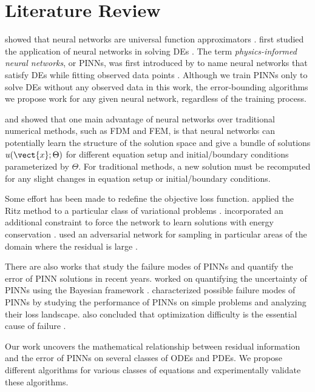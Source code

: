 
\chapter{Literature Review} \label{chapter:literature-review}
    \citeauthor{hornik1989multilayer} showed that neural networks are universal function approximators \cite{hornik1989multilayer}. 
    \citeauthor{lagaris1998artificial} first studied the application of neural networks in solving DEs \cite{lagaris1998artificial}.
    The term \textit{physics-informed neural networks}, or PINNs, was first introduced by \citeauthor{raissi2019physics} to name neural networks that satisfy DEs while fitting observed data points \cite{raissi2019physics}. 
    Although we train PINNs only to solve DEs without any observed data in this work, the error-bounding algorithms we propose work for any given neural network, regardless of the training process.

    \citeauthor{flamant2020solving} and \citeauthor{DesaiShaan2021OTLo} showed that one main advantage of neural networks over traditional numerical methods, such as FDM and FEM, is that neural networks can potentially learn the structure of the solution space and give a bundle of solutions $u(\vect{x}; \Theta)$ for different equation setup and initial/boundary conditions parameterized by $\Theta$.
    For traditional methods, a new solution must be recomputed for any slight changes in equation setup or initial/boundary conditions.

    Some effort has been made to redefine the objective loss function. 
    \citeauthor{yu2017deep} applied the Ritz method to a particular class of variational problems \cite{yu2017deep}.
    \citeauthor{mattheakis2020hamiltonian} incorporated an additional constraint to force the network to learn solutions with energy conservation \cite{mattheakis2020hamiltonian}.
    \citeauthor{parwani2021adversarial} used an adversarial network for sampling in particular areas of the domain where the residual is large \cite{parwani2021adversarial}.

    There are also works that study the failure modes of PINNs and quantify the error of PINN solutions in recent years. 
    \citeauthor{graf2021uncertainty} worked on quantifying the uncertainty of PINNs using the Bayesian framework \cite{graf2021uncertainty}.
    \citeauthor{krishnapriyan2021characterizing} characterized possible failure modes of PINNs by studying the performance of PINNs on simple problems and analyzing their loss landscape. 
    \citeauthor{krishnapriyan2021characterizing} also concluded that optimization difficulty is the essential cause of failure \cite{krishnapriyan2021characterizing}.

    Our work uncovers the mathematical relationship between residual information and the error of PINNs on several classes of ODEs and PDEs. 
    We propose different algorithms for various classes of equations and experimentally validate these algorithms.

    